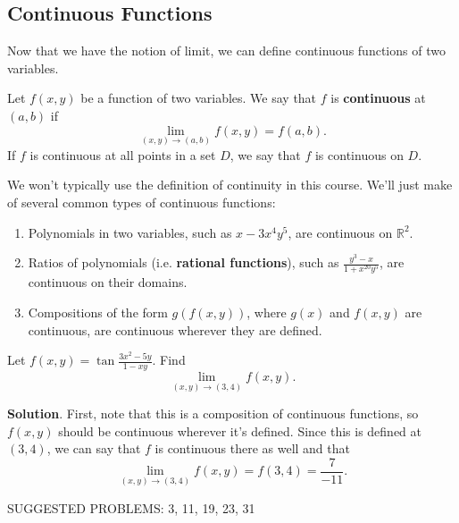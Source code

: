 \documentclass[10pt,]{book}
\newcommand{\terminology}[1]{\textbf{#1}}
\theoremstyle{ptxplainnotitle}
\theoremstyle{ptxplaintitle}
\theoremstyle{ptxplainnotitle}
\theoremstyle{ptxplaintitle}
\theoremstyle{ptxplainnotitle}
\theoremstyle{ptxplaintitle}
\theoremstyle{ptxdefinitionnotitle}
\theoremstyle{ptxdefinitiontitle}
\theoremstyle{ptxdefinitionnotitle}
\theoremstyle{ptxdefinitiontitle}
\theoremstyle{ptxdefinitionnotitle}
\theoremstyle{ptxdefinitiontitle}
\theoremstyle{ptxdefinitionnotitle}
\theoremstyle{ptxdefinitiontitle}
\theoremstyle{ptxdefinitionnotitle}
\theoremstyle{ptxdefinitiontitle}
\numberwithin{equation}{section}
\newcommand{\RR}{\mathbb{R}}
\begin{document}
\subsection[{Continuous Functions}]{Continuous Functions}\label{subsection-continuous-functions}
\hypertarget{p-1005}{}%
Now that we have the notion of limit, we can define continuous functions of two variables.%
\begin{definition}\label{definition-continuous-function-of-two-variables}
\hypertarget{p-1006}{}%
Let \(f(x,y)\) be a function of two variables. We say that \(f\) is \terminology{continuous} at \((a,b)\) if%
\begin{equation*}
\lim_{(x,y)\to(a,b)}f(x,y) = f(a,b).
\end{equation*}
If \(f\) is continuous at all points in a set \(D\), we say that \(f\) is continuous on \(D\).%
\end{definition}
\hypertarget{p-1007}{}%
We won't typically use the definition of continuity in this course. We'll just make of several common types of continuous functions:%
\leavevmode%
\begin{enumerate}
\item\hypertarget{li-76}{}Polynomials in two variables, such as \(x-3x^{4}y^{5}\), are continuous on \(\RR^{2}\).%
\item\hypertarget{li-77}{}Ratios of polynomials (i.e. \terminology{rational functions}), such as \(\frac{y^{3}-x}{1+x^{20}y^{5}}\), are continuous on their domains.%
\item\hypertarget{li-78}{}Compositions of the form \(g(f(x,y))\), where \(g(x)\) and \(f(x,y)\) are continuous, are continuous wherever they are defined.%
\end{enumerate}
\begin{example}\label{example-limit-of-a-continuous-function}
\hypertarget{p-1008}{}%
Let \(f(x,y) = \tan\frac{3x^{2}-5y}{1-xy}\). Find%
\begin{equation*}
\lim_{(x,y)\to(3,4)}f(x,y).
\end{equation*}
%
\par\smallskip%
\noindent\textbf{Solution}.\hypertarget{solution-154}{}\quad%
\hypertarget{p-1009}{}%
First, note that this is a composition of continuous functions, so \(f(x,y)\) should be continuous wherever it's defined. Since this is defined at \((3,4)\), we can say that \(f\) is continuous there as well and that%
\begin{equation*}
\lim_{(x,y)\to(3,4)}f(x,y) = f(3,4) = \frac{7}{-11}.
\end{equation*}
%
\end{example}
\hypertarget{p-1010}{}%
SUGGESTED PROBLEMS: 3, 11, 19, 23, 31%
\typeout{************************************************}
\typeout{************************************************}
\end{document}
